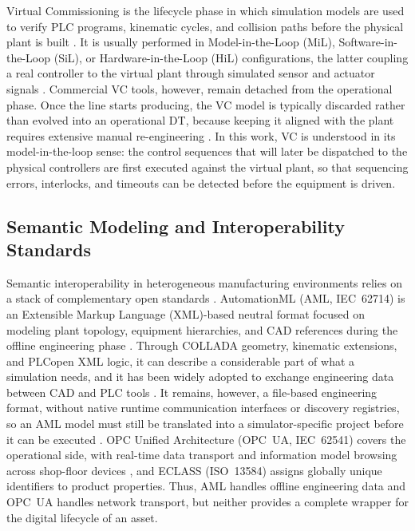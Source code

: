 \documentclass{ieeeojies}
\begin{document}
Virtual Commissioning is the lifecycle phase in which simulation models are used to verify PLC programs, kinematic cycles, and collision paths before the physical plant is built \cite{Lee2014,Striffler2023}. It is usually performed in Model-in-the-Loop (MiL), Software-in-the-Loop (SiL), or Hardware-in-the-Loop (HiL) configurations, the latter coupling a real controller to the virtual plant through simulated sensor and actuator signals \cite{Striffler2023}. Commercial VC tools, however, remain detached from the operational phase. Once the line starts producing, the VC model is typically discarded rather than evolved into an operational DT, because keeping it aligned with the plant requires extensive manual re-engineering \cite{Striffler2023}. In this work, VC is understood in its model-in-the-loop sense: the control sequences that will later be dispatched to the physical controllers are first executed against the virtual plant, so that sequencing errors, interlocks, and timeouts can be detected before the equipment is driven.

\subsection{Semantic Modeling and Interoperability Standards}
\label{sec:rw_standards}

Semantic interoperability in heterogeneous manufacturing environments relies on a stack of complementary open standards \cite{Barnard2024,Ahvanouee2025}. AutomationML (AML, IEC~62714) is an Extensible Markup Language (XML)-based neutral format focused on modeling plant topology, equipment hierarchies, and CAD references during the offline engineering phase \cite{Drath2008,Barnard2024}. Through COLLADA geometry, kinematic extensions, and PLCopen XML logic, it can describe a considerable part of what a simulation needs, and it has been widely adopted to exchange engineering data between CAD and PLC tools \cite{Drath2008,Luder2020}. It remains, however, a file-based engineering format, without native runtime communication interfaces or discovery registries, so an AML model must still be translated into a simulator-specific project before it can be executed \cite{Alexopoulos2025}. OPC Unified Architecture (OPC~UA, IEC~62541) covers the operational side, with real-time data transport and information model browsing across shop-floor devices \cite{Pajpach2023,Barnard2024}, and ECLASS (ISO~13584) assigns globally unique identifiers to product properties. Thus, AML handles offline engineering data and OPC~UA handles network transport, but neither provides a complete wrapper for the digital lifecycle of an asset.
\end{document}
